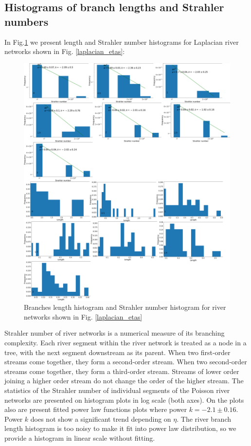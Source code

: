 \documentclass[]{pracamgr}
\begin{document}
      \subsection{Histograms of branch lengths and Strahler numbers}
      
        In Fig.\ref{laplacian_etas_analysis} we present length and Strahler number histograms for Laplacian river networks shown in Fig. \ref{laplacian_etas}:
        
        \begin{figure}[H]
          \centering
          \includegraphics[width=1\textwidth]{figs/sims/strahler_and_leght_histogram_for_laplacian_field.png}        
          \caption{Branches length histogram and Strahler number histogram for river networks shown in Fig. \ref{laplacian_etas}}
          \label{laplacian_etas_analysis}
        \end{figure}

        Strahler number of river networks is a numerical measure of its branching complexity. Each river segment within the river network is treated as a node in a tree, with the next segment downstream as its parent. When two first-order streams come together, they form a second-order stream. When two second-order streams come together, they form a third-order stream. Streams of lower order joining a higher order stream do not change the order of the higher stream. The statistics of the Strahler number of individual segments of the Poisson river networks are presented on histogram plots in log scale (both axes). On the plots also are present fitted power law functions plots where power $k = -2.1 \pm 0.16$. Power $k$ does not show a significant trend depending on $\eta$. The river branch length histogram is too noisy to make it fit into power law distribution, so we provide a histogram in linear scale without fitting.
\end{document}
